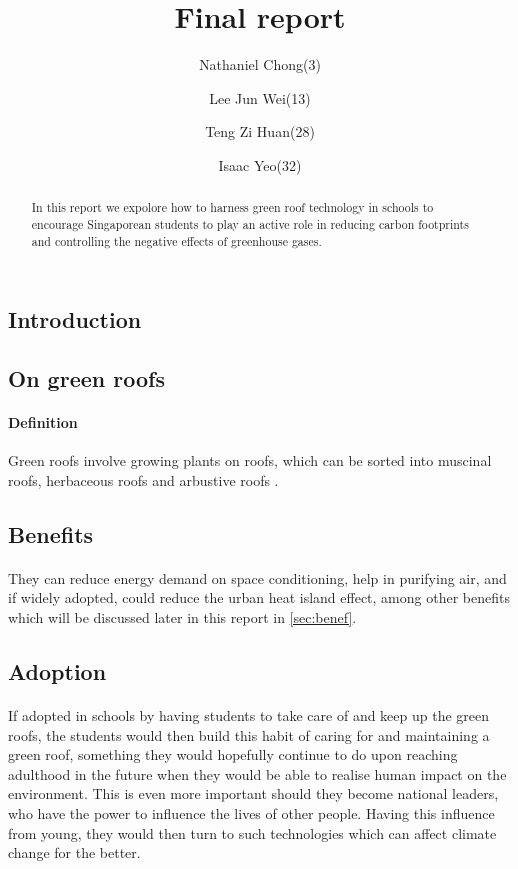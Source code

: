 \documentclass{article}
\title{Final report}
\author{Nathaniel Chong(3) \and Lee Jun Wei(13) \and Teng Zi Huan(28) \and Isaac Yeo(32)}
\begin{document}
\maketitle
\newpage
\tableofcontents
\newpage

\begin{abstract}
  In this report we expolore how to harness green roof technology in
  schools to encourage Singaporean students to play an active role in
  reducing carbon footprints and controlling the negative effects of
  greenhouse gases.
\end{abstract}

\begin{multicols}{2}

  \section{Introduction}
  \subsection{On green roofs}
  \paragraph{Definition} Green roofs involve growing plants on roofs,
  which can be sorted into muscinal roofs, herbaceous roofs and arbustive
  roofs \cite{ecoeng}.


  \subsection{Benefits}
  \paragraph{} They can reduce energy demand on space conditioning,
  help in purifying air, and if widely adopted, could reduce the urban
  heat island effect, among other benefits \cite{energeff} which will
  be discussed later in this report in \autoref{sec:benef}.


  \subsection{Adoption}
  \paragraph{} If adopted in schools by having students to take care
  of and keep up the green roofs, the students would then build this
  habit of caring for and maintaining a green roof, something they would
  hopefully continue to do upon reaching adulthood in the future when
  they would be able to realise human impact on the environment. This is
  even more important should they become national leaders, who have the
  power to influence the lives of other people. Having this influence
  from young, they would then turn to such technologies which can affect
  climate change for the better.


\end{multicols}
\end{document}
